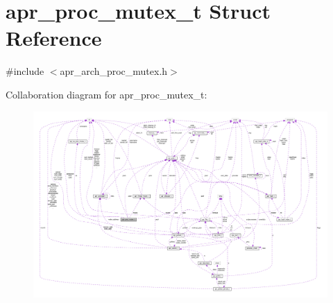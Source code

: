 \hypertarget{structapr__proc__mutex__t}{}\section{apr\+\_\+proc\+\_\+mutex\+\_\+t Struct Reference}
\label{structapr__proc__mutex__t}


{\ttfamily \#include $<$apr\+\_\+arch\+\_\+proc\+\_\+mutex.\+h$>$}



Collaboration diagram for apr\+\_\+proc\+\_\+mutex\+\_\+t\+:
\nopagebreak
\begin{figure}[H]
\begin{center}
\leavevmode
\includegraphics[width=350pt]{structapr__proc__mutex__t__coll__graph}
\end{center}
\end{figure}

